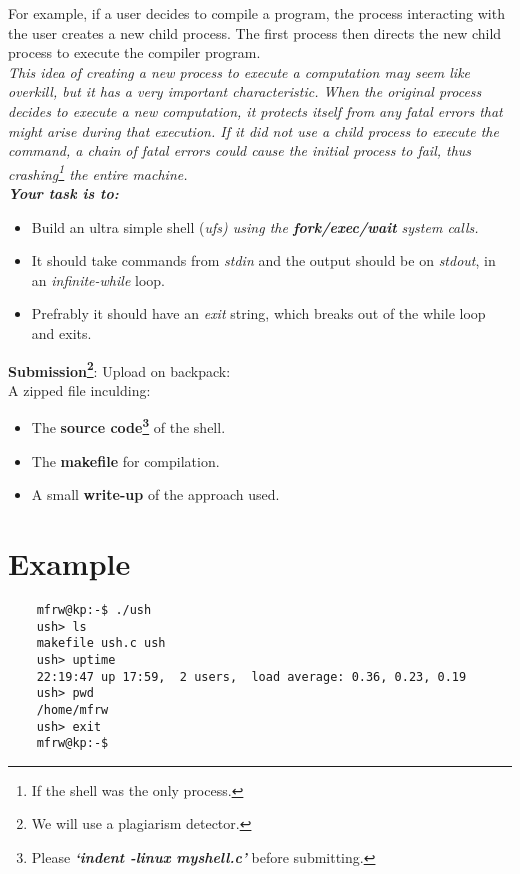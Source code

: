 \documentclass{article}
\begin{document}
	  \em {For example, if a user decides to compile a program, the process interacting with the user creates a new child process.  The first process then directs the new child process to execute the compiler program. \em \\

This idea of creating a new process to execute a computation may seem like overkill, but it has a very important characteristic.  When the original process decides to execute a new computation, it protects itself from any fatal errors that might arise during that execution.  If it did not use a child process to execute the command, a chain of fatal errors could cause the initial process to fail, thus crashing\footnote[2]{If the shell was the only process.} the entire machine. \\

\textbf{Your task is to:}
\begin{itemize}
	\item Build an ultra simple shell (\em{ufs}) \em using the \textit{\textbf{fork/exec/wait}} system calls.
	\item It should take commands from \textit{stdin} and the output should be on \textit{stdout}, in an \textit{infinite-while} loop.
	\item Prefrably it should have an \textit{exit} string, which breaks out of the while loop and exits.
\end{itemize}
\textbf{Submission\footnote[3]{We will use a plagiarism detector.}}: Upload on backpack: \\
	A zipped file inculding:
\begin{itemize}
	\item The \textbf{source code\footnote[4]{Please \textbf{\textit{`indent -linux myshell.c'}} before submitting.}} of the shell.
	\item The \textbf{makefile} for compilation.
	\item A small \textbf{write-up} of the approach used.
\end{itemize}

\section{Example}
\begin{verbatim}
	mfrw@kp:-$ ./ush
	ush> ls
	makefile ush.c ush
	ush> uptime
	22:19:47 up 17:59,  2 users,  load average: 0.36, 0.23, 0.19
	ush> pwd
	/home/mfrw
	ush> exit
	mfrw@kp:-$
\end{verbatim}

}
\end{document}
